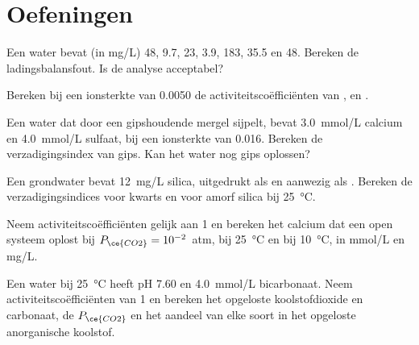 \section{Oefeningen}

\begin{exercise}[$\star$]\label{exo:b3:water-rock-interaction:1}
Een water bevat (in \unit{mg/L})  48,  9.7,  23,  3.9,
 183,  35.5 en  48. Bereken de
ladingsbalansfout. Is de analyse acceptabel?
\end{exercise}

\begin{exercise}[$\star$]\label{exo:b3:water-rock-interaction:2}
Bereken bij een ionsterkte van 0.0050 de activiteitscoëfficiënten van
,  en .
\end{exercise}

\begin{exercise}[$\star$]\label{exo:b3:water-rock-interaction:3}
Een water dat door een gipshoudende mergel sijpelt, bevat \qty{3.0}{mmol/L} calcium en
\qty{4.0}{mmol/L} sulfaat, bij een ionsterkte van 0.016. Bereken de
verzadigingsindex van gips. Kan het water nog gips oplossen?
\end{exercise}

\begin{exercise}[$\star$]\label{exo:b3:water-rock-interaction:4}
Een grondwater bevat \qty{12}{mg/L} silica, uitgedrukt als  en
aanwezig als . Bereken de verzadigingsindices voor kwarts en voor
amorf silica bij \qty{25}{\celsius}.
\end{exercise}

\begin{exercise}[$\star\star$]\label{exo:b3:water-rock-interaction:5}
Neem activiteitscoëfficiënten gelijk aan 1 en bereken het calcium dat
een open systeem oplost bij $P_{\ce{CO2}} = 10^{-2}$~atm, bij \qty{25}{\celsius} en bij
\qty{10}{\celsius}, in \unit{mmol/L} en \unit{mg/L}.
\end{exercise}

\begin{exercise}[$\star\star$]\label{exo:b3:water-rock-interaction:6}
Een water bij \qty{25}{\celsius} heeft pH 7.60 en \qty{4.0}{mmol/L}
bicarbonaat. Neem activiteitscoëfficiënten van 1 en bereken het opgeloste
koolstofdioxide en carbonaat, de $P_{\ce{CO2}}$ en het aandeel van elke soort in
het opgeloste anorganische koolstof.
\end{exercise}

